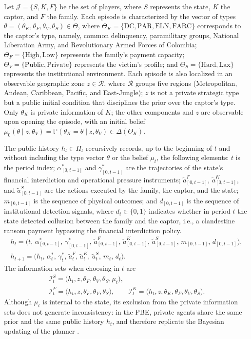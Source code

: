 \documentclass[review,authoryear,12pt]{elsarticle}
\theoremstyle{plain}
\theoremstyle{definition}
\newcommand{\Prob}{\mathbb{P}}
\newcommand{\ThetaK}{\Theta_K}
\newcommand{\1}{\mathbf{1}}
\begin{document}
Let $\mathcal{J}=\{S,K,F\}$ be the set of players, where $S$ represents the state, $K$ the captor, and $F$ the family. Each episode is characterized by the vector of types $\theta=(\theta_K,\theta_F,\theta_V,\theta_S)\in\Theta$, where $\ThetaK=\{\text{DC},\text{PAR},\text{ELN},\text{FARC}\}$ corresponds to the captor's type, namely, common delinquency, paramilitary groups, National Liberation Army, and Revolutionary Armed Forces of Colombia; $\Theta_F=\{\text{High},\text{Low}\}$ represents the family's payment capacity; $\Theta_V=\{\text{Public},\text{Private}\}$ represents the victim's profile; and $\Theta_S=\{\text{Hard},\text{Lax}\}$ represents the institutional environment. Each episode is also localized in an observable geographic zone $z\in\mathcal{R}$, where $\mathcal{R}$ groups five regions (Metropolitan, Andean, Caribbean, Pacific, and East-Jungle); $z$ is not a private strategic type but a public initial condition that disciplines the prior over the captor's type. Only $\theta_K$ is private information of $K$; the other components and $z$ are observable upon opening the episode, with an initial belief $\mu_0(\theta\mid z,\theta_V)=\Prob(\theta_K=\theta\mid z,\theta_V)\in\Delta(\ThetaK)$.


The public history $h_t\in H_t$ recursively records, up to the beginning of $t$ and without including the type vector $\theta$ or the belief $\mu_t$, the following elements: $t$ is the period index; $\alpha^\ast_{[0,t-1]}$ and $\gamma^\ast_{[0,t-1]}$ are the trajectories of the state's financial interdiction and operational pressure instruments; $\tilde{a}^F_{[0,t-1]}$, $\tilde{a}^K_{[0,t-1]}$, and $\tilde{a}^S_{[0,t-1]}$ are the actions executed by the family, the captor, and the state; $m_{[0,t-1]}$ is the sequence of physical outcomes; and $d_{[0,t-1]}$ is the sequence of institutional detection signals, where $d_t\in\{0,1\}$ indicates whether in period $t$ the state detected collusion between the family and the captor, i.e., a clandestine ransom payment bypassing the financial interdiction policy.
\begin{gather}
h_t = \bigl(t,\,\alpha^\ast_{[0,t-1]},\,\gamma^\ast_{[0,t-1]},\,\tilde{a}^F_{[0,t-1]},\,\tilde{a}^K_{[0,t-1]},\,\tilde{a}^S_{[0,t-1]},\,m_{[0,t-1]},\,d_{[0,t-1]}\bigr),\label{eq:historia-publica}\\
h_{t+1} = \bigl(h_t,\,\alpha_t^\ast,\,\gamma_t^\ast,\,\tilde{a}_t^F,\,\tilde{a}_t^K,\,\tilde{a}_t^S,\,m_t,\,d_t\bigr).\label{eq:actualizacion-historia}
\end{gather}
The information sets when choosing in $t$ are
\begin{gather*}
\mathcal{I}_t^S=\bigl(h_t,z,\theta_F,\theta_V,\theta_S,\mu_t\bigr),\\
\mathcal{I}_t^F=\bigl(h_t,z,\theta_F,\theta_V,\theta_S\bigr),\qquad
\mathcal{I}_t^K=\bigl(h_t,z,\theta_K,\theta_F,\theta_V,\theta_S\bigr).
\end{gather*}
Although $\mu_t$ is internal to the state, its exclusion from the private information sets does not generate inconsistency: in the PBE, private agents share the same prior and the same public history $h_t$, and therefore replicate the Bayesian updating of the planner \citet{FudenbergTirole1991}.
\end{document}
